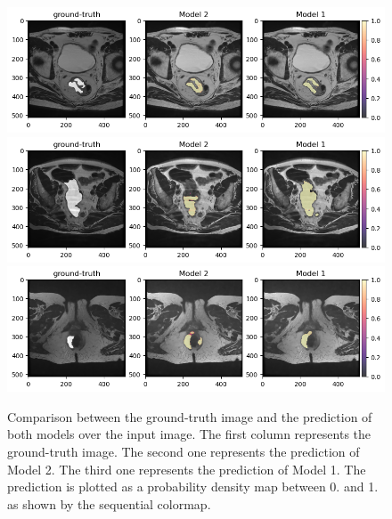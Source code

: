 \documentclass{standalone}
\begin{document}
\begin{figure}[htp]

    \centering
    \includegraphics[width=\textwidth]{../images/predcomparisonoverlap.png}
    \includegraphics[width=\textwidth]{../images/predcomparisonoverlap1.png}
    \includegraphics[width=\textwidth]{../images/predcomparisonoverlap2.png}
    

    \caption{Comparison between the ground-truth image and the prediction of both models over the input image. 
    The first column represents the ground-truth image. 
    The second one represents the prediction of Model 2. 
    The third one represents the prediction of Model 1.
    The prediction is plotted as a probability density map between 0. and 1. as shown by the sequential colormap.}\label{predcomparisonoverlap}

\end{figure}
\end{document}
